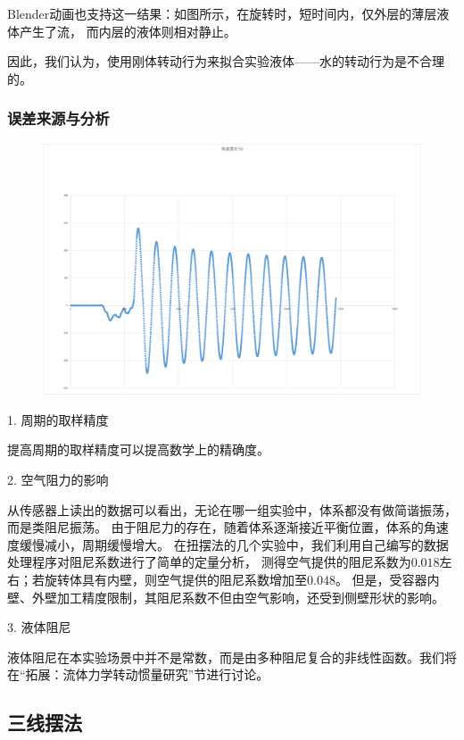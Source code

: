\documentclass[12pt,hyperref,a4paper,UTF8]{ctexart}
\begin{document}
Blender动画也支持这一结果：如图所示，在旋转时，短时间内，仅外层的薄层液体产生了流，
而内层的液体则相对静止。

因此，我们认为，使用刚体转动行为来拟合实验液体——水的转动行为是不合理的。

\subsubsection{误差来源与分析}

\begin{figure}[htbp]
    \centering
    \includegraphics{damp.eps}
    \caption{}
\end{figure}

1. 周期的取样精度

提高周期的取样精度可以提高数学上的精确度。

2. 空气阻力的影响

从传感器上读出的数据可以看出，无论在哪一组实验中，体系都没有做简谐振荡，而是类阻尼振荡。
由于阻尼力的存在，随着体系逐渐接近平衡位置，体系的角速度缓慢减小，周期缓慢增大。
在扭摆法的几个实验中，我们利用自己编写的数据处理程序对阻尼系数进行了简单的定量分析，
测得空气提供的阻尼系数为$0.018$左右；若旋转体具有内壁，则空气提供的阻尼系数增加至$0.048$。
但是，受容器内壁、外壁加工精度限制，其阻尼系数不但由空气影响，还受到侧壁形状的影响。

3. 液体阻尼

液体阻尼在本实验场景中并不是常数，而是由多种阻尼复合的非线性函数。我们将在“拓展：流体力学转动惯量研究”节进行讨论。

\subsection{三线摆法}
\end{document}
